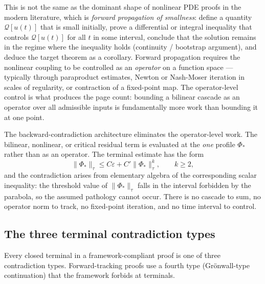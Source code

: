 \documentclass[11pt]{article}
\theoremstyle{plain}
\theoremstyle{definition}
\theoremstyle{remark}
\begin{document}
This is not the same as the dominant shape of nonlinear PDE proofs in the
modern literature, which is \textit{forward propagation of smallness}: define a
quantity \(\mathcal{Q}[u(t)]\) that is small initially, prove a differential
or integral inequality that controls \(\mathcal{Q}[u(t)]\) for all \(t\) in some
interval, conclude that the solution remains in the regime where the inequality
holds (continuity / bootstrap argument), and deduce the target theorem as a
corollary. Forward propagation requires the nonlinear coupling to be controlled
as an \textit{operator} on a function space — typically through paraproduct
estimates, Newton or Nash-Moser iteration in scales of regularity, or
contraction of a fixed-point map. The operator-level control is what produces
the page count: bounding a bilinear cascade as an operator over all admissible
inputs is fundamentally more work than bounding it at one point.

The backward-contradiction architecture eliminates the operator-level work.
The bilinear, nonlinear, or critical residual term is evaluated at the
\textit{one} profile \(\Phi_*\) rather than as an operator. The terminal
estimate has the form
\[
  \|\Phi_*\|_\tau \leq C\varepsilon + C'\|\Phi_*\|_\tau^k, \qquad k \geq 2,
\]
and the contradiction arises from elementary algebra of the corresponding
scalar inequality: the threshold value of \(\|\Phi_*\|_\tau\) falls in the
interval forbidden by the parabola, so the assumed pathology cannot occur.
There is no cascade to sum, no operator norm to track, no fixed-point
iteration, and no time interval to control.

\subsection{The three terminal contradiction types}
\label{subsec:terminal-types}

Every closed terminal in a framework-compliant proof is one of three
contradiction types. Forward-tracking proofs use a fourth type (Grönwall-type
continuation) that the framework forbids at terminals.
\end{document}

